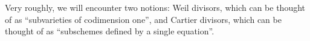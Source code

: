 Very roughly, we will encounter two notions: Weil divisors, which can be thought of as
\enquote{subvarieties of codimension one}, and Cartier divisors, which can be thought of as
\enquote{subschemes defined by a single equation}.
